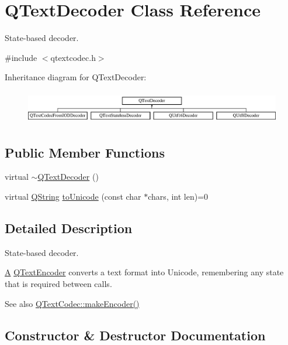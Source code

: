 \hypertarget{class_q_text_decoder}{}\section{Q\+Text\+Decoder Class Reference}
\label{class_q_text_decoder}


State-\/based decoder.  




{\ttfamily \#include $<$qtextcodec.\+h$>$}

Inheritance diagram for Q\+Text\+Decoder\+:\begin{figure}[H]
\begin{center}
\leavevmode
\includegraphics[height=1.473684cm]{class_q_text_decoder}
\end{center}
\end{figure}
\subsection*{Public Member Functions}
\begin{DoxyCompactItemize}
\item 
virtual \mbox{\hyperlink{class_q_text_decoder_ad5772ca1143d9a4f460b5848fb764581}{$\sim$\+Q\+Text\+Decoder}} ()
\item 
virtual \mbox{\hyperlink{class_q_string}{Q\+String}} \mbox{\hyperlink{class_q_text_decoder_aec543f7f6670dfda14164268e2da879d}{to\+Unicode}} (const char $\ast$chars, int len)=0
\end{DoxyCompactItemize}


\subsection{Detailed Description}
State-\/based decoder. 

\mbox{\hyperlink{class_a}{A}} \mbox{\hyperlink{class_q_text_encoder}{Q\+Text\+Encoder}} converts a text format into Unicode, remembering any state that is required between calls.

\begin{DoxySeeAlso}{See also}
\mbox{\hyperlink{class_q_text_codec_aa7dccd7fc1b578de0b7599b040d98e11}{Q\+Text\+Codec\+::make\+Encoder()}} 
\end{DoxySeeAlso}


\subsection{Constructor \& Destructor Documentation}
\mbox{\label{class_q_text_decoder_ad5772ca1143d9a4f460b5848fb764581}} 
